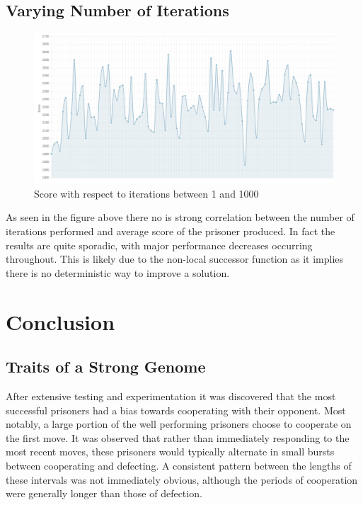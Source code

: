 \documentclass[12pt]{article}
\begin{document}
\subsection{Varying Number of Iterations}
\begin{figure}[h]
    \caption{Score with respect to iterations between 1 and 1000}
    \centering
    \includegraphics[scale=0.4]{figures/hill_climb.png}
\end{figure}

As seen in the figure above there no is strong correlation between the number
of iterations performed and average score of the prisoner produced.  In fact the results
are quite sporadic, with major performance decreases occurring throughout.  This is
likely due to the non-local successor function as it implies there is no deterministic way
to improve a solution.

\pagebreak

\section{Conclusion}

\subsection{Traits of a Strong Genome}
After extensive testing and experimentation it was discovered that the most successful prisoners
had a bias towards cooperating with their opponent. Most notably, a large portion of
the well performing prisoners choose to cooperate on the first move.
It was observed that rather than immediately responding to the most recent moves, these prisoners would
typically alternate in small bursts between cooperating and defecting. A consistent
pattern between the lengths of these intervals was not immediately obvious, although
the periods of cooperation were generally longer than those of defection.
\end{document}
